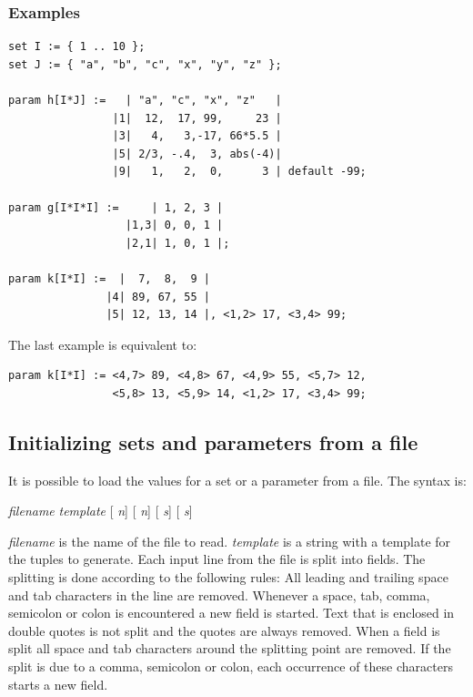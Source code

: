\subsubsection{Examples}
{\small
\begin{verbatim}
set I := { 1 .. 10 };
set J := { "a", "b", "c", "x", "y", "z" };

param h[I*J] :=   | "a", "c", "x", "z"   |
                |1|  12,  17, 99,     23 |
                |3|   4,   3,-17, 66*5.5 |
                |5| 2/3, -.4,  3, abs(-4)|
                |9|   1,   2,  0,      3 | default -99;

param g[I*I*I] :=     | 1, 2, 3 |
                  |1,3| 0, 0, 1 |
                  |2,1| 1, 0, 1 |;

param k[I*I] :=  |  7,  8,  9 |
               |4| 89, 67, 55 |
               |5| 12, 13, 14 |, <1,2> 17, <3,4> 99;
\end{verbatim}
}
\noindent The last example is equivalent to:
{\small
\begin{verbatim}
param k[I*I] := <4,7> 89, <4,8> 67, <4,9> 55, <5,7> 12,
                <5,8> 13, <5,9> 14, <1,2> 17, <3,4> 99;
\end{verbatim}
}

\subsection{Initializing sets and parameters from a file}\label{initfromfile}
It is possible to load the values for a set or a parameter from a
file. The syntax is:

\smallskip
{} \emph{filename}  \emph{template}
[ \emph{n}] [ \emph{n}]
[ \emph{s}] [ \emph{s}]

\smallskip
\noindent\emph{filename} is the name of the file to read.
\emph{template} is a string with a template for the tuples to
generate. Each input line from the file is split into fields. The
splitting is done according to the following rules:
All leading and trailing space and tab characters in the line are removed.
Whenever a space, tab, comma, semicolon or colon is encountered
a new field is started. Text that is enclosed in double quotes is not
split and the quotes are always removed. When a field is split all space
and tab characters around the splitting point are removed.
If the split is
due to a comma, semicolon or colon, each occurrence of these
characters starts a new field.

